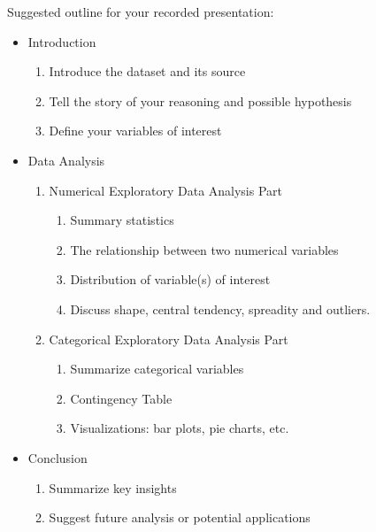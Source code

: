 \documentclass[12pt]{article}
\begin{document}
Suggested outline for your recorded presentation:
\begin{itemize}
    \item Introduction
    \begin{enumerate}
        \item Introduce the dataset and its source
        \item Tell the story of your reasoning and possible hypothesis
        \item Define your variables of interest
    \end{enumerate}
    \item Data Analysis
    \begin{enumerate}
        \item Numerical Exploratory Data Analysis Part
        \begin{enumerate}
            \item Summary statistics
            \item The relationship between two numerical variables
            \item Distribution of variable(s) of interest
            \item Discuss shape, central tendency, spreadity and outliers.
        \end{enumerate}
        \item Categorical Exploratory Data Analysis Part
        \begin{enumerate}
            \item Summarize categorical variables
            \item Contingency Table
            \item Visualizations: bar plots, pie charts, etc.
        \end{enumerate}
    \end{enumerate}
    \item Conclusion
        \begin{enumerate}
            \item Summarize key insights
            \item Suggest future analysis or potential applications
        \end{enumerate}
\end{itemize}
\end{document}
